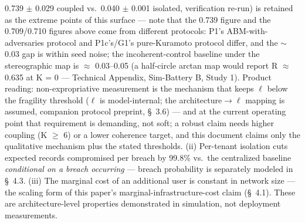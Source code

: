 \documentclass[
]{article}
\begin{document}
\begin{itemize}
  0.739 \(\pm\) 0.029 coupled vs.~0.040 \(\pm\) 0.001 isolated,
  verification re-run) is retained as the extreme points of this surface
  --- note that the 0.739 figure and the 0.709/0.710 figures above come
  from different protocols: P1's ABM-with-adversaries protocol and
  P1c's/G1's pure-Kuramoto protocol differ, and the \(\sim\)0.03 gap is
  within seed noise; the incoherent-control baseline under the
  stereographic map is \(\approx\) 0.03--0.05 (a half-circle arctan map
  would report R \(\approx\) 0.635 at K = 0 --- Technical Appendix,
  Sim-Battery B, Study 1). Product reading: non-expropriative
  measurement is the mechanism that keeps \(\ell\) below the fragility
  threshold (\(\ell\) is model-internal; the architecture\(\to\ell\)
  mapping is assumed, companion protocol preprint, §~3.6) --- and at the
  current operating point that requirement is demanding, not soft; a
  robust claim needs higher coupling (K \(\geq\) 6) or a lower coherence
  target, and this document claims only the qualitative mechanism plus
  the stated thresholds. (ii) Per-tenant isolation cuts expected records
  compromised per breach by 99.8\% vs.~the centralized baseline
  \emph{conditional on a breach occurring} --- breach probability is
  separately modeled in §~4.3. (iii) The marginal cost of an additional
  user is constant in network size --- the scaling form of this paper's
  marginal-infrastructure-cost claim (§~4.1). These are
  architecture-level properties demonstrated in simulation, not
  deployment measurements.


\end{itemize}
\end{document}
